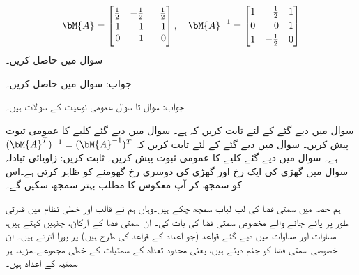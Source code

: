 \begin{align*}
\bM{A}=\begin{bmatrix*}[r] \frac{1}{2}&-\frac{1}{2}&\frac{1}{2}\\[0.5ex]1&-1&-1\\0&1&0\end{bmatrix*},\quad \bM{A}^{-1}=
\begin{bmatrix*}[r]1&\frac{1}{2}&1\\[0.5ex]0&0&1\\[0.5ex]1&-\frac{1}{2}&0\end{bmatrix*}
\end{align*}
سوال  میں  حاصل کریں۔

جواب:
سوال  میں  حاصل کریں۔

جواب:
سوال  تا سوال  عمومی نوعیت کے سوالات ہیں۔

سوال  میں دیے گئے  کے لئے  ثابت کریں کہ  ہے۔
سوال  میں دیے گئے کلیے کا عمومی ثبوت پیش کریں۔
سوال  میں دیے گئے  کے لئے  ثابت کریں کہ 
\begin{math}
(\bM{A}^T)^{-1}=(\bM{A}^{-1})^T
\end{math}
ہے۔
سوال  میں دیے گئے کلیے کا عمومی ثبوت پیش کریں۔
ثابت کریں:  
\quad زاویائی تبادلہ\\
سوال  میں   گھڑی کی ایک رخ اور  گھڑی کی دوسری رخ  گھومنے کو ظاہر کرتی ہے۔اس کو سمجھ کر آپ معکوس کا مطلب بہتر سمجھ سکیں گے۔  

ہم حصہ  میں سمتی فضا کی لب لباب سمجھ چکے ہیں۔وہاں ہم نے قالب اور خطی نظام میں قدرتی طور پر پائے جانے والے مخصوص سمتی فضا کی بات کی۔ ان سمتی فضا کے ارکان، جنہیں  کہتے ہیں، مساوات  اور مساوات  میں دیے گئے قواعد (جو اعداد کے قواعد کی طرح ہیں) پر پورا اترتے ہیں۔ ان خصوصی سمتی فضا کو  جنم دیتے ہیں، یعنی محدود تعداد کے سمتیات کے خطی مجموعے۔مزید، ہر سمتیہ کے     اعداد ہیں۔

